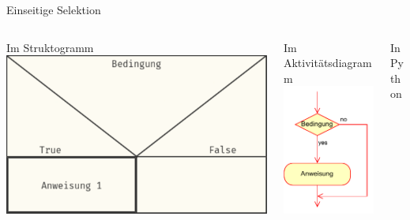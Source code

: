 \documentclass[xelatex,aspectratio=169]{beamer}
\begin{document}
\begin{frame}{Einseitige Selektion}

  \begin{columns}[t]
    \begin{column}{.4\linewidth}
      \begin{block}{Im Struktogramm}
        \centering
        \includegraphics[width=\textwidth]{fig/algorithmus_einseitige_selektion_struktogram.pdf}
      \end{block}
    \end{column}
    \begin{column}{.3\linewidth}
      \begin{block}{Im Aktivitätsdiagramm}
        \centering
        \includegraphics[height=.7\textheight]{fig/algorithmus_einseitige_selektion_aktivitaetsdiagram.drawio.pdf}
      \end{block}

    \end{column}
    \begin{column}{.3\linewidth}
      \begin{block}{In Python}
        \inputminted{python}{src/algorithmus_einseitige_selektion.py}
      \end{block}

    \end{column}
  \end{columns}

\end{frame}
\end{document}
